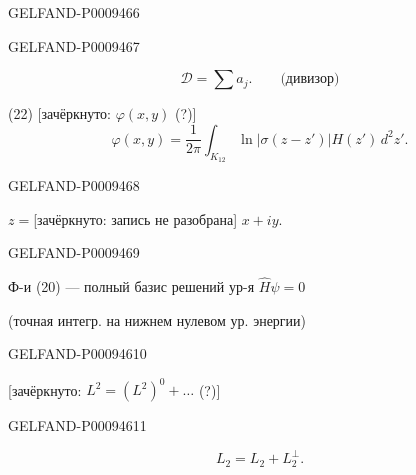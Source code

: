\begin{GelfandAdjacentEvidence}{GELFAND-P000946}{6}

\end{GelfandAdjacentEvidence}
\begin{GelfandAdjacentEvidence}{GELFAND-P000946}{7}

\[
 \mathcal D=\sum a_j.\qquad\text{(дивизор)}
\]

(22) [зачёркнуто: \sout{\(\varphi(x,y)\)} (?)]
\begin{equation*}
 \varphi(x,y)=\frac{1}{2\pi}\int_{K_{12}}\ln|\sigma(z-z')|H(z')\,d^2z'.
\end{equation*}
\end{GelfandAdjacentEvidence}
\begin{GelfandAdjacentEvidence}{GELFAND-P000946}{8}

\(z={}\)[зачёркнуто: запись не разобрана] \(x+iy\).
\end{GelfandAdjacentEvidence}
\begin{GelfandAdjacentEvidence}{GELFAND-P000946}{9}


Ф-и (20) --- полный базис решений ур-я $\hat H\psi=0$

(точная интегр. на нижнем нулевом ур. энергии)
\end{GelfandAdjacentEvidence}
\begin{GelfandAdjacentEvidence}{GELFAND-P000946}{10}


[зачёркнуто: $L^2=(L^2)^0+\ldots$ (?)]
\end{GelfandAdjacentEvidence}
\begin{GelfandAdjacentEvidence}{GELFAND-P000946}{11}

\[
 L_2=L_2+L_2^\perp.
\]
\end{GelfandAdjacentEvidence}
